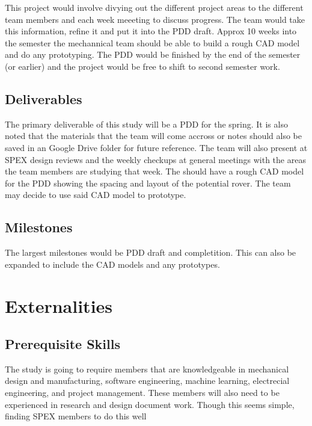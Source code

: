 \documentclass[conference]{IEEEtran} %
\begin{document}
This project would involve divying out the different project areas to the different team members and each week meeeting to discuss progress. 
The team would take this information, refine it and put it into the PDD draft. 
Approx 10 weeks into the semester the mechannical team should be able to build a rough CAD model and do any prototyping.
The PDD would be finished by the end of the semester (or earlier) and the project would be free to shift to second semester work.    

\subsection{Deliverables}
\label{subsec:deliverables}
The primary deliverable of this study will be a PDD for the spring. It is also noted that the materials that the team will come accross or notes should also be saved in an Google Drive folder for future reference.  
The team will also present at SPEX design reviews and the weekly checkups at general meetings with the areas the team members are studying that week.
The should have a rough CAD model for the PDD showing the spacing and layout of the potential rover. 
The team may decide to use said CAD model to prototype. 

\subsection{Milestones}
\label{subsec:milestones}
The largest milestones would be PDD draft and completition. This can also be expanded to include the CAD models and any prototypes. 

\section{Externalities}
\subsection{Prerequisite Skills}
The study is going to require members that are knowledgeable in mechanical design and manufacturing, software engineering, machine learning, electrecial engineering, and project management. These members will also need to be experienced in research and design document work. Though this seems simple, finding SPEX members to do this well  
\end{document}
